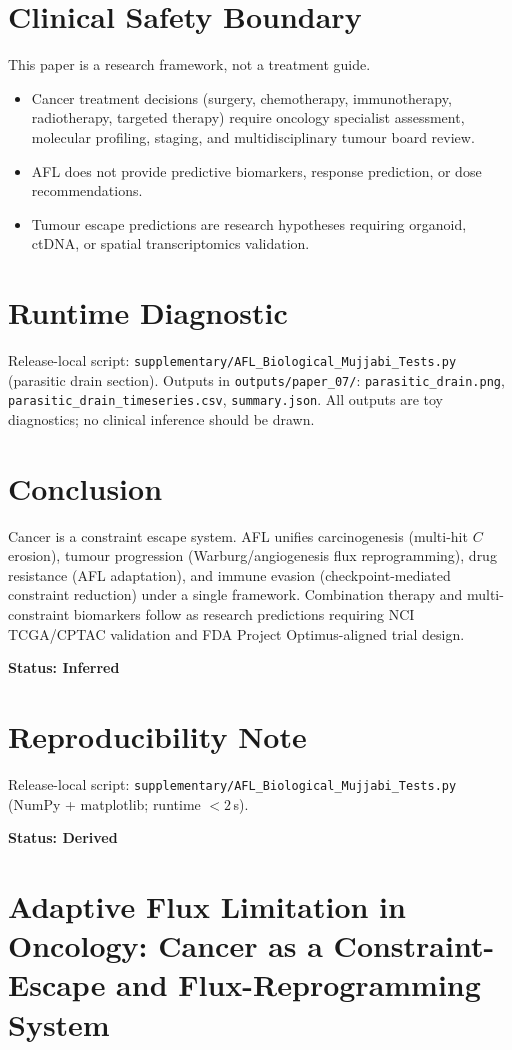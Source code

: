 \documentclass[12pt,a4paper]{article}
\begin{document}
\section{Clinical Safety Boundary}

This paper is a research framework, not a treatment guide.
\begin{itemize}
    \item Cancer treatment decisions (surgery, chemotherapy, immunotherapy, radiotherapy, targeted therapy) require oncology specialist assessment, molecular profiling, staging, and multidisciplinary tumour board review.
    \item AFL does not provide predictive biomarkers, response prediction, or dose recommendations.
    \item Tumour escape predictions are research hypotheses requiring organoid, ctDNA, or spatial transcriptomics validation.
\end{itemize}

\section{Runtime Diagnostic}

Release-local script: \texttt{supplementary/AFL\_Biological\_Mujjabi\_Tests.py} (parasitic drain section). Outputs in \texttt{outputs/paper\_07/}: \texttt{parasitic\_drain.png}, \texttt{parasitic\_drain\_timeseries.csv}, \texttt{summary.json}. All outputs are toy diagnostics; no clinical inference should be drawn.

\section{Conclusion}

Cancer is a constraint escape system. AFL unifies carcinogenesis (multi-hit $C$ erosion), tumour progression (Warburg/angiogenesis flux reprogramming), drug resistance (AFL adaptation), and immune evasion (checkpoint-mediated constraint reduction) under a single framework. Combination therapy and multi-constraint biomarkers follow as research predictions requiring NCI TCGA/CPTAC validation and FDA Project Optimus-aligned trial design.

\textbf{Status: Inferred}

\section{Reproducibility Note}

Release-local script: \texttt{supplementary/AFL\_Biological\_Mujjabi\_Tests.py} (NumPy + matplotlib; runtime $< 2$\,s).

\textbf{Status: Derived}
\clearpage
\section*{Adaptive Flux Limitation in Oncology: Cancer as a Constraint-Escape and Flux-Reprogramming System}




\end{document}
